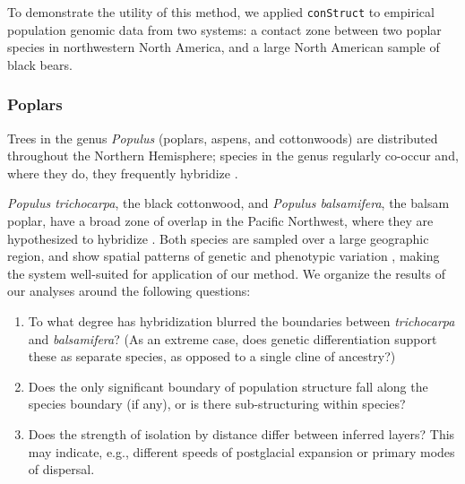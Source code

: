 \documentclass[10pt,letterpaper]{article}
\begin{document}
To demonstrate the utility of this method, we applied \texttt{conStruct} to empirical population genomic data from two systems:
a contact zone between two poplar species in northwestern North America,
and a large North American sample of black bears.



\subsubsection*{Poplars}

Trees in the genus \textit{Populus} (poplars, aspens, and cottonwoods) 
are distributed throughout the Northern Hemisphere;
species in the genus regularly co-occur and, 
where they do, they frequently hybridize \cite{eckenwalder1984, Cronk2005}.

\textit{Populus trichocarpa}, the black cottonwood,
and \textit{Populus balsamifera}, the balsam poplar,
have a broad zone of overlap in the Pacific Northwest,
where they are hypothesized to hybridize \cite{geraldes_etal_2014, suarezgonzalez_etal_2016}.
Both species are sampled over a large geographic region, 
and show spatial patterns of genetic and phenotypic variation \cite{slavov_etal_2012, mckown_etal_2013},
making the system well-suited for application of our method.
We organize the results of our analyses around the following questions: 
\begin{enumerate}

    \item To what degree has hybridization blurred the boundaries between 
        \textit{trichocarpa} and \textit{balsamifera}?
        (As an extreme case, does genetic differentiation support these as separate species,
        as opposed to a single cline of ancestry?)

    \item Does the only significant boundary of population structure
        fall along the species boundary (if any),
        or is there sub-structuring within species?

    \item Does the strength of isolation by distance differ between inferred layers?
        This may indicate, e.g., different speeds of postglacial expansion
        or primary modes of dispersal.

\end{enumerate}
\end{document}

